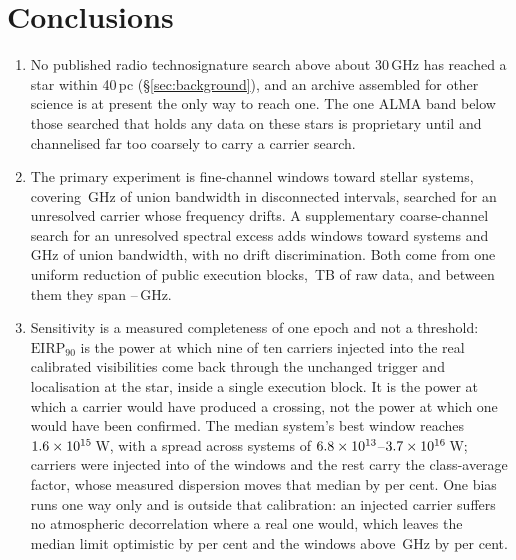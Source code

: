 \section{Conclusions}
\label{sec:conclusions}

\begin{enumerate}[leftmargin=1.6em,itemsep=4pt,topsep=4pt,parsep=0pt]

\item No published radio technosignature search above about 30\,GHz has
reached a star within 40\,pc (\S\ref{sec:background}), and an archive
assembled for other science is at present the only way to reach one. The one
ALMA band below those searched that holds any data on these stars is
proprietary until \SbBoneRelYear{} and channelised far too coarsely to carry
a carrier search.

\item The primary experiment is \NWinA{} fine-channel windows toward
\NSysClassA{} stellar systems, covering \CvUnionA\,GHz of union bandwidth in
disconnected intervals, searched for an unresolved carrier whose frequency
drifts. A supplementary coarse-channel search for an unresolved spectral
excess adds \NWinB{} windows toward \PrSysClassB{} systems and
\CvUnionB\,GHz of union bandwidth, with no drift discrimination. Both come
from one uniform reduction of \NEB{} public execution blocks,
\TotalDataTB\,TB of raw data, and between them they span
\SurvFreqLo--\SurvFreqHi\,GHz.

\item Sensitivity is a measured completeness of one epoch and not a
threshold: $\mathrm{EIRP}_{90}$ is the power at which nine of ten carriers
injected into the real calibrated visibilities come back through the
unchanged trigger and localisation at the star, inside a single execution
block. It is the power at which a carrier would have produced a crossing,
not the power at which one would have been confirmed. The median system's
best window reaches $1.6\times10^{15}$\,W, with a spread across systems of
$6.8\times10^{13}$--$3.7\times10^{16}$\,W; carriers were injected into
\SensNInj{} of the \NWinA{} windows and the rest carry the class-average
factor, whose measured dispersion moves that median by \ScRsMedShiftPct{} per
cent. One bias runs one way only and is outside that calibration: an injected
carrier suffers no atmospheric decorrelation where a real one would, which
leaves the median limit optimistic by \SensDecorPct{} per cent and the
windows above \SensDecorHiGHz\,GHz by \SensDecorHiPct{} per cent.


\end{enumerate}
